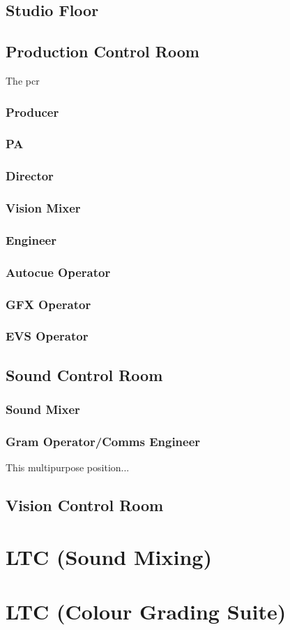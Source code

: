 \documentclass{report}
\begin{document}
\subsection{Studio Floor}
\subsection{Production Control Room}
The \gls{pcr}
\subsubsection{Producer}
\subsubsection{PA}
\subsubsection{Director}
\subsubsection{Vision Mixer}
\subsubsection{Engineer}
\subsubsection{Autocue Operator}
\subsubsection{GFX Operator}
\subsubsection{EVS Operator}
\subsection{Sound Control Room}
\subsubsection{Sound Mixer}
\subsubsection{Gram Operator/Comms Engineer}
This multipurpose position...
\subsection{Vision Control Room}
\section{LTC (Sound Mixing)}
\section{LTC (Colour Grading Suite)}
\end{document}
